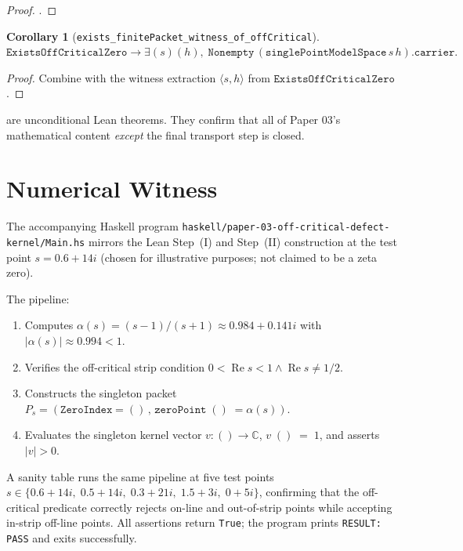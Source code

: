 \documentclass[12pt]{article}
\newtheorem{corollary}[theorem]{Corollary}
\theoremstyle{definition}
\theoremstyle{remark}
\newcommand{\C}{\mathbb{C}}
\newcommand{\re}{\operatorname{Re}}
\begin{document}
\begin{proof}
.
\end{proof}

\begin{corollary}[\texttt{exists\_finitePacket\_witness\_of\_offCritical}]\label{cor:exists-witness}
\(
\texttt{ExistsOffCriticalZero}\to
\exists (s) (h),\;\texttt{Nonempty}\,(\texttt{singlePointModelSpace}\,s\,h).\texttt{carrier}.
\)
\end{corollary}

\begin{proof}
Combine  with the witness extraction
$\langle s, h\rangle$ from $\texttt{ExistsOffCriticalZero}$.
\end{proof}

 are unconditional Lean theorems.
They confirm that all of Paper 03's mathematical content \emph{except} the
final transport step is closed.

\section{Numerical Witness}\label{sec:numerics}

The accompanying Haskell program
\texttt{haskell/paper-03-off-critical-defect-kernel/Main.hs} mirrors the
Lean Step~(I) and Step~(II) construction at the test point
$s = 0.6 + 14i$ (chosen for illustrative purposes; not claimed to be a
zeta zero).

The pipeline:
\begin{enumerate}
\item Computes $\alpha(s) = (s-1)/(s+1)
\approx 0.984 + 0.141i$ with
$|\alpha(s)|\approx 0.994 < 1$.
\item Verifies the off-critical strip condition
$0 < \re s < 1\wedge \re s\neq 1/2$.
\item Constructs the singleton packet
$P_{s} = (\texttt{ZeroIndex}=()\,,\,
\texttt{zeroPoint}\;()\;=\alpha(s))$.
\item Evaluates the singleton kernel vector
$v : ()\to\C$, $v\;()\;=\;1$, and asserts $|v|>0$.
\end{enumerate}
A sanity table runs the same pipeline at five test points
$s\in\{0.6+14i,\;0.5+14i,\;0.3+21i,\;1.5+3i,\;0+5i\}$, confirming that the
off-critical predicate correctly rejects on-line and out-of-strip points
while accepting in-strip off-line points. All assertions return
\texttt{True}; the program prints \texttt{RESULT: PASS} and exits
successfully.
\end{document}
